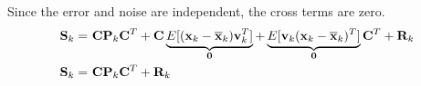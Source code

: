 Since the error and noise are independent, the cross terms are zero.
\begin{align*}
  \mathbf{S}_k =~& \mathbf{C}\mathbf{P}_k\mathbf{C}^T +
    \mathbf{C}\underbrace{E[(\mathbf{x}_k - \overline{\mathbf{x}}_k)\mathbf{v}_k^T]}_{\mathbf{0}} +
    \underbrace{
      E[\mathbf{v}_k(\mathbf{x}_k - \overline{\mathbf{x}}_k)^T]}_{\mathbf{0}}\mathbf{C}^T + \mathbf{R}_k \\
  \mathbf{S}_k =~& \mathbf{C}\mathbf{P}_k\mathbf{C}^T + \mathbf{R}_k
\end{align*}
